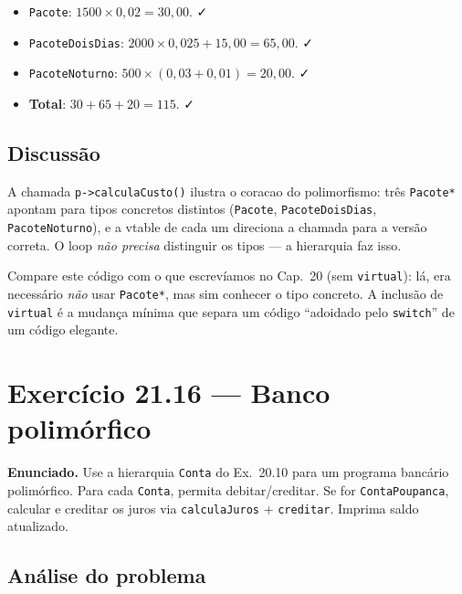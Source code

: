 \documentclass[11pt,a4paper]{article}
\begin{document}
\begin{itemize}[leftmargin=*,itemsep=0pt]
  \item \texttt{Pacote}: $1500 \times 0{,}02 = 30{,}00$. ✓
  \item \texttt{PacoteDoisDias}: $2000 \times 0{,}025 + 15{,}00 = 65{,}00$. ✓
  \item \texttt{PacoteNoturno}: $500 \times (0{,}03 + 0{,}01) = 20{,}00$. ✓
  \item \textbf{Total}: $30 + 65 + 20 = 115$. ✓
\end{itemize}

\subsection*{Discuss\~ao}

A chamada \texttt{p->calculaCusto()} ilustra o coracao do polimorfismo: tr\^es \texttt{Pacote*} apontam para tipos concretos distintos (\texttt{Pacote}, \texttt{PacoteDoisDias}, \texttt{PacoteNoturno}), e a vtable de cada um direciona a chamada para a vers\~ao correta. O loop \emph{n\~ao precisa} distinguir os tipos --- a hierarquia faz isso.

\begin{obseng}
Compare este c\'odigo com o que escrev\'iamos no Cap.~20 (sem \texttt{virtual}): l\'a, era necess\'ario \emph{n\~ao} usar \texttt{Pacote*}, mas sim conhecer o tipo concreto. A inclus\~ao de \texttt{virtual} \'e a mudan\c{c}a m\'inima que separa um c\'odigo ``adoidado pelo \texttt{switch}'' de um c\'odigo elegante.
\end{obseng}

\newpage
\section{Exerc\'icio 21.16 --- Banco polim\'orfico}

\begin{enunciado}
\textbf{Enunciado.} Use a hierarquia \texttt{Conta} do Ex.~20.10 para um programa banc\'ario polim\'orfico. Para cada \texttt{Conta}, permita debitar/creditar. Se for \texttt{ContaPoupanca}, calcular e creditar os juros via \texttt{calculaJuros} + \texttt{creditar}. Imprima saldo atualizado.
\end{enunciado}

\subsection*{An\'alise do problema}
\end{document}
